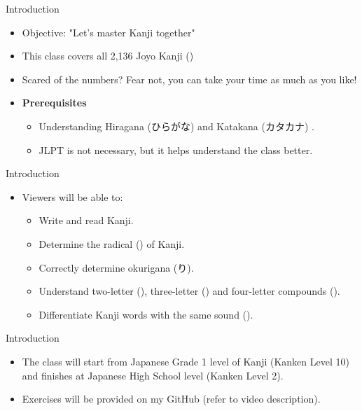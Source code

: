 \documentclass[12pt,aspectratio=169]{beamer}
\newenvironment{items}
	{\begin{itemize}
		\setlength\itemsep{5pt}
	}{\end{itemize}}
\begin{document}
	\begin{frame}{Introduction}
		\begin{items}
			\item Objective: "Let's master Kanji together"
			\item This class covers all 2,136 Joyo Kanji ()
			\item Scared of the numbers? Fear not, you can take your time as much as you like!
			\item \textbf{Prerequisites}
			\begin{items}
				\item Understanding Hiragana (ひらがな) and Katakana (カタカナ) .
				\item JLPT is not necessary, but it helps understand the class better.
			\end{items}
		\end{items}
	\end{frame}

	\begin{frame}{Introduction}
		\begin{items}
			\item Viewers will be able to:
			\begin{itemize}
				\item Write and read Kanji.
				\item Determine the radical () of Kanji.
				\item Correctly determine okurigana (り).
				\item Understand two-letter (), three-letter () and four-letter compounds ().
				\item Differentiate Kanji words with the same sound ().
			\end{itemize}
		\end{items}
	\end{frame}

	\begin{frame}{Introduction}
		\begin{itemize}
			\item The class will start from Japanese Grade 1 level of Kanji (Kanken Level 10) and finishes at Japanese High School level (Kanken Level 2).
			\item Exercises will be provided on my GitHub (refer to video description).
		\end{itemize}
	\end{frame}
\end{document}
